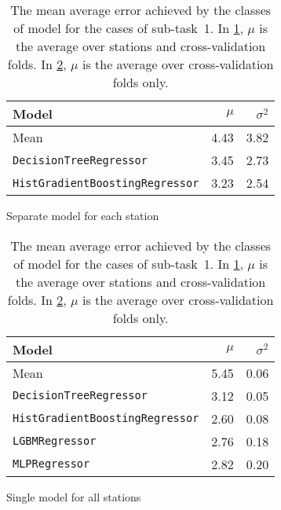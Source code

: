 \documentclass[11pt]{extarticle}
\begin{document}
\begin{table}
  \centering
  \begin{subfigure}{\textwidth}
    \centering
    \begin{tabular}{lrr}
      \toprule
      Model                                  & $\mu$ & $\sigma^2$
      \\
      \midrule
      Mean                                   & 4.43  & 3.82
      \\
      \texttt{DecisionTreeRegressor}         & 3.45  & 2.73
      \\
      \texttt{HistGradientBoostingRegressor} & 3.23  & 2.54
      \\
      \bottomrule
    \end{tabular}
    \caption{Separate model for each station}
    \label{tab:chart-subtask-1-1}
  \end{subfigure}
  \par\bigskip\bigskip
  \begin{subfigure}{\textwidth}
    \centering
    \begin{tabular}{lrr}
      \toprule
      Model                                  & $\mu$ & $\sigma^2$
      \\
      \midrule
      Mean                                   & 5.45  & 0.06
      \\
      \texttt{DecisionTreeRegressor}         & 3.12  & 0.05
      \\
      \texttt{HistGradientBoostingRegressor} & 2.60  & 0.08
      \\
      \texttt{LGBMRegressor}                 & 2.76  & 0.18
      \\
      \texttt{MLPRegressor}                  & 2.82  & 0.20
      \\
      \bottomrule
    \end{tabular}
    \caption{Single model for all stations}
    \label{tab:chart-subtask-1-2}
  \end{subfigure}
  \caption{The mean average error achieved by the classes of model for the cases of sub-task~1.
    In \cref{tab:chart-subtask-1-1}, $\mu$ is the average over stations and cross-validation folds.
    In \cref{tab:chart-subtask-1-2}, $\mu$ is the average over cross-validation folds only.
  }
  \label{tab:chart-subtask-1}
\end{table}

\printbibliography
\end{document}
